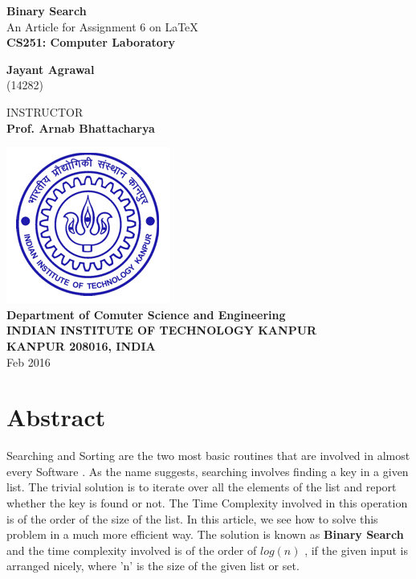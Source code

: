 \documentclass{article}
\begin{document}

\begin{center}

\textbf{\Huge Binary Search} \\
\vspace{50pt}
{\large An Article for Assignment 6 on \LaTeX } \\
\textbf{\large CS251: Computer Laboratory} \\
\vspace{100pt}

\textbf{\large Jayant Agrawal} \\
(14282)
\vspace{30pt}

INSTRUCTOR \\
\textbf{Prof. Arnab Bhattacharya}
\vspace{100pt}

\includegraphics[width=0.3\columnwidth]{logo.jpg}\\
\textbf{\large Department of Comuter Science and Engineering \\
INDIAN INSTITUTE OF TECHNOLOGY KANPUR \\
KANPUR 208016, INDIA \\ } 
\vspace{20pt}
Feb 2016


\end{center}

\restoregeometry
\newpage
{}
\tableofcontents
{}
\listoffigures
\listoftables


\newpage
{}

\section{Abstract}
Searching  and Sorting  are the two most basic routines that are involved in almost every Software . As the name suggests, searching involves finding a key in a given list. The trivial solution is to iterate over all the elements of the list and report whether the key is found or not. The Time Complexity  involved in this operation is of the order of the size of the list. In this article, we see how to solve this problem in a much more efficient way. The solution is known as \textbf{Binary Search}  and the time complexity involved is of the order of $log(n)$ , if the given input is arranged nicely, where 'n' is the size of the given list or set.
\end{document}
